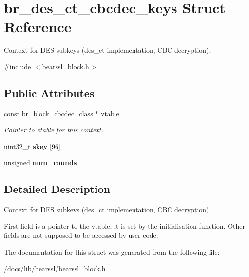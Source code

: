 \hypertarget{structbr__des__ct__cbcdec__keys}{}\section{br\+\_\+des\+\_\+ct\+\_\+cbcdec\+\_\+keys Struct Reference}
\label{structbr__des__ct__cbcdec__keys}


Context for D\+ES subkeys ({\ttfamily des\+\_\+ct} implementation, C\+BC decryption).  




{\ttfamily \#include $<$bearssl\+\_\+block.\+h$>$}

\subsection*{Public Attributes}
\begin{DoxyCompactItemize}
\item 
\mbox{\label{structbr__des__ct__cbcdec__keys_a3fc3b0c828f8700877bf515625061492}} 
const \hyperlink{bearssl__block_8h_a5542970c820eeee2e62766368be8fb7f}{br\+\_\+block\+\_\+cbcdec\+\_\+class} $\ast$ \hyperlink{structbr__des__ct__cbcdec__keys_a3fc3b0c828f8700877bf515625061492}{vtable}
\begin{DoxyCompactList}\small\item\em Pointer to vtable for this context. \end{DoxyCompactList}\item 
\mbox{\label{structbr__des__ct__cbcdec__keys_a14f316bc4726106083d923172fecf062}} 
uint32\+\_\+t {\bfseries skey} \mbox{[}96\mbox{]}
\item 
\mbox{\label{structbr__des__ct__cbcdec__keys_a21053abf98129fd59dd6c4a0b8888b28}} 
unsigned {\bfseries num\+\_\+rounds}
\end{DoxyCompactItemize}


\subsection{Detailed Description}
Context for D\+ES subkeys ({\ttfamily des\+\_\+ct} implementation, C\+BC decryption). 

First field is a pointer to the vtable; it is set by the initialisation function. Other fields are not supposed to be accessed by user code. 

The documentation for this struct was generated from the following file\+:\begin{DoxyCompactItemize}
\item 
/docs/lib/bearssl/\hyperlink{bearssl__block_8h}{bearssl\+\_\+block.\+h}\end{DoxyCompactItemize}
